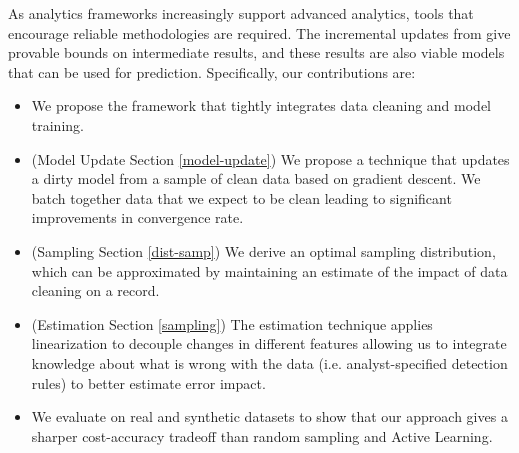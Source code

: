 As analytics frameworks increasingly support advanced analytics, tools that encourage reliable methodologies are required.
The incremental updates from \sys give provable bounds on intermediate results, and these results are also viable models that can be used for prediction. 
Specifically, our contributions are:
\begin{itemize}[noitemsep]
\item We propose the \sys framework that tightly integrates data cleaning and model training.
\item (Model Update Section \ref{model-update}) We propose a technique that updates a dirty model from a sample of clean data based on gradient descent. We batch together data that we expect to be clean leading to significant improvements in convergence rate.
\item (Sampling Section \ref{dist-samp}) We derive an optimal sampling distribution, which can be approximated by maintaining an estimate of the impact of data cleaning on a record. 
\item (Estimation Section \ref{sampling}) The estimation technique applies linearization to decouple changes in different features allowing us to integrate knowledge about what is wrong with the data (i.e. analyst-specified detection rules) to better estimate error impact.
\item We evaluate \sysfull on real and synthetic datasets to show that our approach gives a sharper cost-accuracy tradeoff than random sampling and Active Learning.
\end{itemize}






